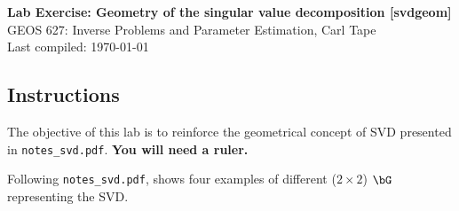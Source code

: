 \documentclass[11pt,titlepage,fleqn]{article}
\begin{document}

\begin{spacing}{1.2}
\centering
{\large \bf Lab Exercise: Geometry of the singular value decomposition [svdgeom]} \\
GEOS 627: Inverse Problems and Parameter Estimation, Carl Tape \\
Last compiled: \today
\end{spacing}


\subsection*{Instructions}

The objective of this lab is to reinforce the geometrical concept of SVD \citep{TrefethenBau} presented in \verb+notes_svd.pdf+. {\bf You will need a ruler.}

Following \verb+notes_svd.pdf+,  shows four examples of different ($2 \times 2$) $\bG$ representing the SVD.
\end{document}
